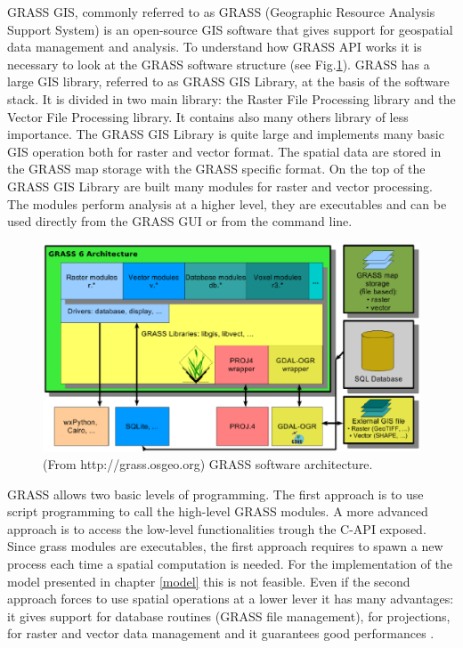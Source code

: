 \documentclass[12pt,a4paper,twoside]{book}
\begin{document}
GRASS GIS, commonly referred to as GRASS (Geographic Resource Analysis Support System) is an open-source GIS software that gives support for geospatial data management and analysis. To understand how GRASS API works it is necessary to look at the GRASS software structure (see Fig.\ref{grass_structure}). GRASS has a large GIS library, referred to as GRASS GIS Library, at the basis of the software stack. It is divided in two main library: the Raster File Processing library and the Vector File Processing library. It contains also many others library of less importance. The GRASS GIS Library is quite large and implements many basic GIS operation both for raster and vector format. The spatial data are stored in the GRASS map storage with the GRASS specific format. On the top of the GRASS GIS Library are built many modules for raster and vector processing. The modules perform analysis at a higher level, they are executables and can be used directly from the GRASS GUI or from the command line.

\begin{figure}
  \begin{center}
    \includegraphics[width=\textwidth]{images/grass6_arch.eps}
    \caption{(From http://grass.osgeo.org) GRASS software architecture.}\label{grass_structure}
  \end{center}
\end{figure}

GRASS allows two basic levels of programming. The first approach is to use script programming to call the high-level GRASS modules. A more advanced approach is to access the low-level functionalities trough the C-API exposed. Since grass modules are executables, the first approach requires to spawn a new process each time a spatial computation is needed. For the implementation of the model presented in chapter \ref{model} this is not feasible. Even if the second approach forces to use spatial operations at a lower lever it has many advantages: it gives support for database routines (GRASS file management), for projections, for raster and  vector data management and it guarantees good performances \cite{net2008}.
\end{document}
